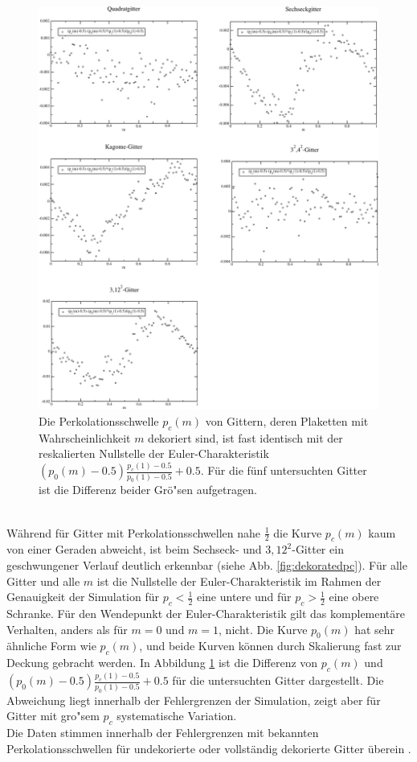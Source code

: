\begin{figure}[htbp]
  \includegraphics{./Schranken-figs/scale}
  \caption{Die Perkolationsschwelle $p_c(m)$ von Gittern, deren Plaketten mit Wahrscheinlichkeit $m$ dekoriert sind, ist fast identisch mit der reskalierten Nullstelle der Euler-Charakteristik $(p_0(m)-0.5)\frac{p_c(1)-0.5}{p_0(1)-0.5}+0.5$. F\"ur die f\"unf untersuchten Gitter ist die Differenz beider Gr\"o"sen aufgetragen.}
\label{fig:scale}
\end{figure}
\\W\"ahrend f\"ur Gitter mit Perkolationsschwellen nahe $\frac{1}{2}$ die Kurve $p_c(m)$ kaum von einer Geraden abweicht, ist beim Sechseck- und $3,12^2$-Gitter ein geschwungener Verlauf deutlich erkennbar (siehe Abb. \ref{fig:dekoratedpc}). F\"ur alle Gitter und alle $m$ ist die Nullstelle der Euler-Charakteristik im Rahmen der Genauigkeit der Simulation f\"ur $p_c<\frac{1}{2}$ eine untere und f\"ur $p_c>\frac{1}{2}$ eine obere Schranke. F\"ur den Wendepunkt der Euler-Charakteristik gilt das komplement\"are Verhalten, anders als f\"ur $m=0$ und $m=1$, nicht. Die Kurve $p_0(m)$ hat sehr \"ahnliche Form wie $p_c(m)$, und beide Kurven k\"onnen durch Skalierung fast zur Deckung gebracht werden. In Abbildung \ref{fig:scale} ist die Differenz von $p_c(m)$ und $(p_0(m)-0.5)\frac{p_c(1)-0.5}{p_0(1)-0.5}+0.5$ f\"ur die untersuchten Gitter dargestellt. Die Abweichung liegt innerhalb der Fehlergrenzen der Simulation, zeigt aber f\"ur Gitter mit gro"sem $p_c$ systematische Variation.\\
Die Daten stimmen innerhalb der Fehlergrenzen mit bekannten Perkolationsschwellen f\"ur undekorierte oder vollst\"andig dekorierte Gitter \"uberein \cite{Suding:99}.


